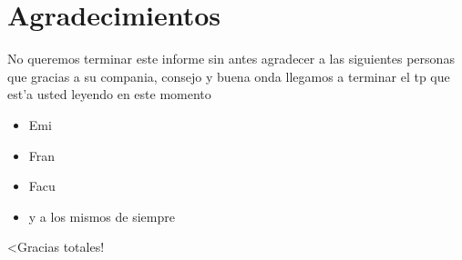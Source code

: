 \section{Agradecimientos}

	No queremos terminar este informe sin antes agradecer a las siguientes personas que gracias a su compania, consejo y buena onda llegamos a terminar el tp que est'a usted leyendo en este momento
\begin{itemize}
 \item Emi
 \item Fran
 \item Facu
 \item y a los mismos de siempre
\end{itemize}

	<Gracias totales!
